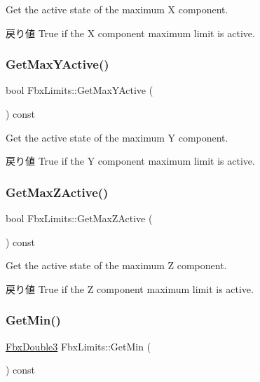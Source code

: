Get the active state of the maximum X component. \begin{DoxyReturn}{戻り値}
True if the X component maximum limit is active. 
\end{DoxyReturn}
\mbox{\label{class_fbx_limits_a9c35de6b7cf9fbc6eb72b6cc37211cd7}} 
\subsubsection{\texorpdfstring{Get\+Max\+Y\+Active()}{GetMaxYActive()}}
{\footnotesize\ttfamily bool Fbx\+Limits\+::\+Get\+Max\+Y\+Active (\begin{DoxyParamCaption}{ }\end{DoxyParamCaption}) const}

Get the active state of the maximum Y component. \begin{DoxyReturn}{戻り値}
True if the Y component maximum limit is active. 
\end{DoxyReturn}
\mbox{\label{class_fbx_limits_a80245178e61a5c9145685ea619731b3c}} 
\subsubsection{\texorpdfstring{Get\+Max\+Z\+Active()}{GetMaxZActive()}}
{\footnotesize\ttfamily bool Fbx\+Limits\+::\+Get\+Max\+Z\+Active (\begin{DoxyParamCaption}{ }\end{DoxyParamCaption}) const}

Get the active state of the maximum Z component. \begin{DoxyReturn}{戻り値}
True if the Z component maximum limit is active. 
\end{DoxyReturn}
\mbox{\label{class_fbx_limits_a9c58030943ee716e37374c7ec77c7283}} 
\subsubsection{\texorpdfstring{Get\+Min()}{GetMin()}}
{\footnotesize\ttfamily \hyperlink{fbxtypes_8h_ae0a96f14cde566774c7553aa7523b7a7}{Fbx\+Double3} Fbx\+Limits\+::\+Get\+Min (\begin{DoxyParamCaption}{ }\end{DoxyParamCaption}) const}

